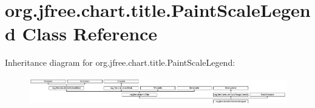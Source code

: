 \hypertarget{classorg_1_1jfree_1_1chart_1_1title_1_1_paint_scale_legend}{}\section{org.\+jfree.\+chart.\+title.\+Paint\+Scale\+Legend Class Reference}
\label{classorg_1_1jfree_1_1chart_1_1title_1_1_paint_scale_legend}
Inheritance diagram for org.\+jfree.\+chart.\+title.\+Paint\+Scale\+Legend\+:\begin{figure}[H]
\begin{center}
\leavevmode
\includegraphics[height=1.259843cm]{classorg_1_1jfree_1_1chart_1_1title_1_1_paint_scale_legend}
\end{center}
\end{figure}
